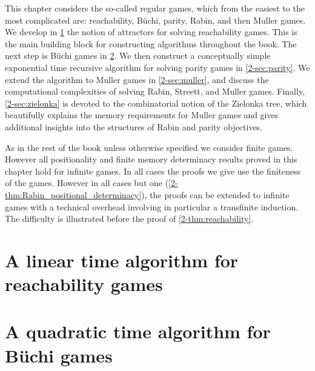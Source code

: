 

This chapter considers the so-called regular games, which from the easiest to the most complicated are: reachability, B{\"u}chi,
parity, Rabin, and then Muller games.
We develop in \cref{2-sec:attractors} the notion of attractors for solving reachability games. 
This is the main building block for constructing algorithms throughout the book.
The next step is B{\"u}chi games in \cref{2-sec:buchi}. 
We then construct a conceptually simple exponential time recursive algorithm for solving parity games in \cref{2-sec:parity}.
We extend the algorithm to Muller games in \cref{2-sec:muller}, and discuss the computational complexities of solving Rabin, Streett, and Muller games.
Finally, \cref{2-sec:zielonka} is devoted to the combinatorial notion of the Zielonka tree, 
which beautifully explains the memory requirements for Muller games and gives additional insights into the structures of Rabin and parity objectives.

\begin{remark}
\label{2-rmk:finite_infinite}
As in the rest of the book unless otherwise specified we consider finite games.
However all positionality and finite memory determinacy results proved in this chapter hold for infinite games.
In all cases the proofs we give use the finiteness of the games.
However in all cases %
but one (\cref{2-thm:Rabin_positional_determinacy}),
the proofs can be extended to infinite games with a technical overhead involving in particular a transfinite induction.
The difficulty is illustrated before the proof of \cref{2-thm:reachability}.
\end{remark}


\section{A linear time algorithm for reachability games}
\label{2-sec:attractors}



\section{A quadratic time algorithm for B{\"u}chi games}
\label{2-sec:buchi}


